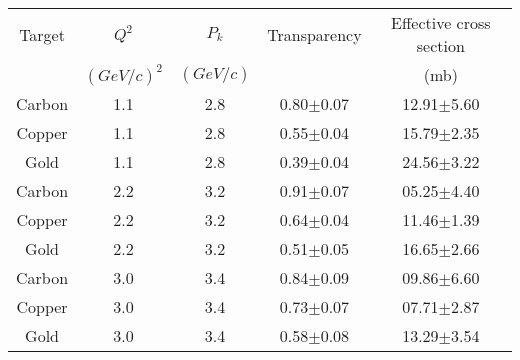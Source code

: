 \begin{center}
\begin{tabular}{||c|c|c|c|c||}\hline
 Target & $Q^2$ & $P_k$ & Transparency & Effective cross section \\
 & $(GeV/c)^2$ & $(GeV/c)$ & & (mb)\\\hline
Carbon & 1.1 & 2.8 & 0.80$\pm$0.07 &12.91$\pm$5.60 \\
Copper & 1.1 & 2.8 & 0.55$\pm$0.04 &15.79$\pm$2.35 \\
Gold   & 1.1 & 2.8 & 0.39$\pm$0.04 &24.56$\pm$3.22 \\\hline
Carbon & 2.2 & 3.2 & 0.91$\pm$0.07 &05.25$\pm$4.40 \\
Copper & 2.2 & 3.2 & 0.64$\pm$0.04 &11.46$\pm$1.39 \\
Gold   & 2.2 & 3.2 & 0.51$\pm$0.05 &16.65$\pm$2.66 \\\hline
Carbon & 3.0 & 3.4 & 0.84$\pm$0.09 &09.86$\pm$6.60 \\
Copper & 3.0 & 3.4 & 0.73$\pm$0.07 &07.71$\pm$2.87 \\
Gold   & 3.0 & 3.4 & 0.58$\pm$0.08 &13.29$\pm$3.54 \\\hline
\end{tabular}
\end{center}